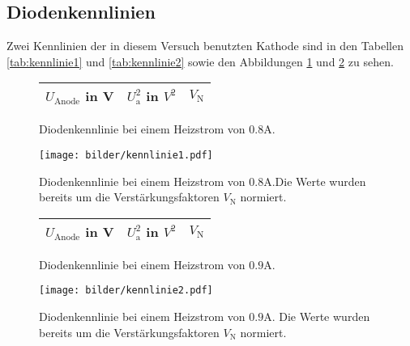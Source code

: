 	


\clearpage
\subsection{Diodenkennlinien}
	Zwei Kennlinien der in diesem Versuch benutzten Kathode sind in 
	den Tabellen \ref{tab:kennlinie1} und \ref{tab:kennlinie2} sowie 
	den Abbildungen \ref{fig:kennlinie1} und \ref{fig:kennlinie2} zu 
	sehen.
	
	\begin{figure}[htbp]
	\begin{minipage}{0.3\textwidth} 
			\centering
			\begin{tabular}{ccc}
				\toprule \midrule
				$U_\text{Anode}$ in V & $U_\text{a}^2$ in $V^2$ 
				& $V_\text{N}$\\
				\midrule
							
				\midrule \bottomrule
			\end{tabular}
			\caption{Diodenkennlinie bei einem Heizstrom von 
			$0.8$A.}
			\label{tab:kennlinie1}
	\end{minipage}
	\hfill
	\begin{minipage}{0.7\textwidth}
			\centering
			\texttt{[image: bilder/kennlinie1.pdf]}
			\caption{Diodenkennlinie bei einem Heizstrom von 
			$0.8$A.Die Werte wurden bereits um die 
			Verstärkungsfaktoren $V_\text{N}$ normiert. }
			\label{fig:kennlinie1}		
	\end{minipage}
	\end{figure}		
	
	
	\begin{figure}[htbp]
	\begin{minipage}{0.3\textwidth} 
			\centering
			\begin{tabular}{ccc}
				\toprule \midrule
				$U_\text{Anode}$ in V & $U_\text{a}^2$ in $V^2$ 
				& $V_\text{N}$\\
				\midrule
							
				\midrule \bottomrule
			\end{tabular}
			\caption{Diodenkennlinie bei einem Heizstrom von 
			$0.9$A.}
			\label{tab:kennlinie2}
	\end{minipage}
	\hfill
	\begin{minipage}{0.7\textwidth}
			\centering
			\texttt{[image: bilder/kennlinie2.pdf]}
			\caption{Diodenkennlinie bei einem Heizstrom von 
			$0.9$A. Die Werte wurden bereits um die 
			Verstärkungsfaktoren $V_\text{N}$ normiert.}
			\label{fig:kennlinie2}		
	\end{minipage}
	\end{figure}		
	
